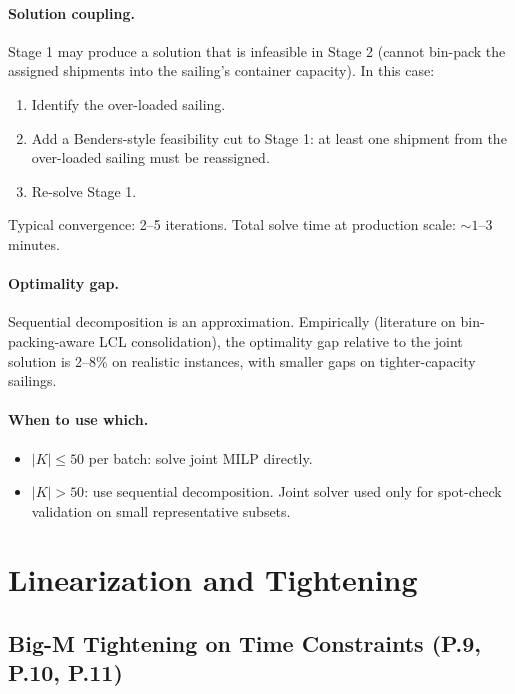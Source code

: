 \documentclass[11pt,a4paper]{article}
\theoremstyle{definition}
\begin{document}
\paragraph{Solution coupling.}
Stage 1 may produce a solution that is infeasible in Stage 2 (cannot bin-pack the assigned
shipments into the sailing's container capacity). In this case:
\begin{enumerate}[noitemsep]
  \item Identify the over-loaded sailing.
  \item Add a Benders-style feasibility cut to Stage 1: at least one shipment from the
        over-loaded sailing must be reassigned.
  \item Re-solve Stage 1.
\end{enumerate}
Typical convergence: 2--5 iterations. Total solve time at production scale: $\sim 1$--$3$ minutes.

\paragraph{Optimality gap.}
Sequential decomposition is an approximation. Empirically (literature on bin-packing-aware
LCL consolidation), the optimality gap relative to the joint solution is 2--8\%
on realistic instances, with smaller gaps on tighter-capacity sailings.

\paragraph{When to use which.}
\begin{itemize}[noitemsep]
  \item $|K| \leq 50$ per batch: solve joint MILP directly.
  \item $|K| > 50$: use sequential decomposition. Joint solver used only for spot-check
        validation on small representative subsets.
\end{itemize}

\section{Linearization and Tightening}

\subsection{Big-M Tightening on Time Constraints (P.9, P.10, P.11)}
\end{document}
